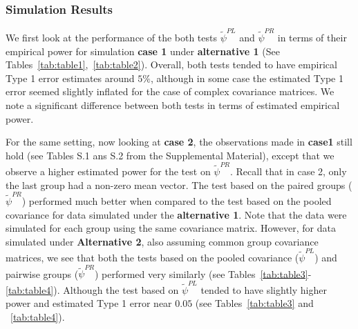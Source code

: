 \documentclass[times,sort&compress,3p]{elsarticle}
\theoremstyle{plain}%
\theoremstyle{definition}
\begin{document}
\subsubsection{Simulation Results}
We first look at the performance of the both tests $\widetilde{\psi}^{PL}$ and $\widetilde{\psi}^{PR}$ in terms of their empirical power for simulation {\bf case 1} under {\bf alternative 1} (See Tables~\ref{tab:table1},~\ref{tab:table2}). 
Overall, both tests tended to have empirical Type 1 error estimates around $5\%$, although in some case the estimated Type 1 error seemed slightly inflated for the case of complex covariance matrices. We note a significant difference between both tests in terms of estimated empirical power.

For the same setting, now looking at {\bf case 2}, the observations made in {\bf case1} still hold (see Tables S.1 ans S.2 from the Supplemental Material), except that we observe a higher estimated power for the test on $\widetilde{\psi}^{PR}$. Recall that in case 2, only the last group had a non-zero mean vector. The test based on the paired groups ($\widetilde{\psi}^{PR}$) performed much better when compared to the test based on the pooled covariance for data simulated under the {\bf alternative 1}. Note that the data were simulated for each group using the same covariance matrix. However, for data simulated under {\bf Alternative 2}, also assuming common group covariance matrices, we see that both the tests based on the pooled covariance ($\widetilde{\psi}^{PL}$) and pairwise groups ($\widetilde{\psi}^{PR}$) performed very similarly (see Tables~\ref{tab:table3}-\ref{tab:table4}). Although the test based on $\widetilde{\psi}^{PL}$ tended to have slightly higher power and estimated Type 1 error near $0.05$ (see Tables~\ref{tab:table3} and ~\ref{tab:table4}).
\end{document}
